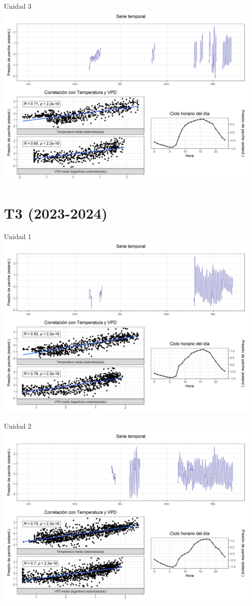 \documentclass[
  letterpaper,
  DIV=11,
  numbers=noendperiod]{scrreprt}
\begin{document}
Unidad 3
\includegraphics{figuras/04_turgor_unidad/2023_2024_Rio_Claro_T2_Unidad_3.png}

\chapter{T3 (2023-2024)}

Unidad 1
\includegraphics{figuras/04_turgor_unidad/2023_2024_Rio_Claro_T3_Unidad_1.png}

Unidad 2
\includegraphics{figuras/04_turgor_unidad/2023_2024_Rio_Claro_T3_Unidad_2.png}
\end{document}
